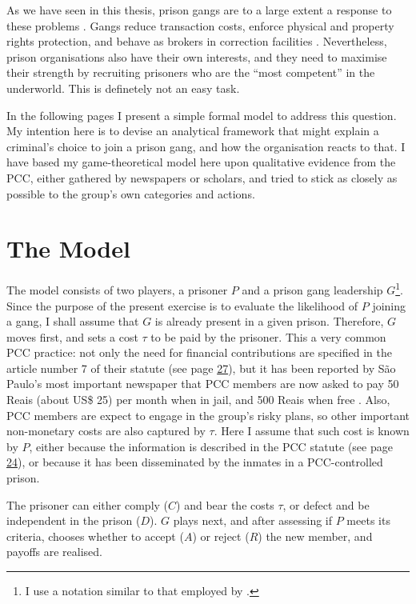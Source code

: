 As we have seen in this thesis, prison gangs are to a large extent a response to these problems \citep[]{camp1985prison, fleisher2001overview}. Gangs reduce transaction costs, enforce physical and property rights protection, and behave as brokers in correction facilities \citep{buentello1991prison, delisi2004gang, skarbek2011governance}. Nevertheless, prison organisations also have their own interests, and they need to maximise their strength by recruiting prisoners who are the ``most competent'' in the underworld. This is definetely not an easy task. 

In the following pages I present a simple formal model to address this question. My intention here is to devise an analytical framework that might explain a criminal's choice to join a prison gang, and how the organisation reacts to that. I have based my game-theoretical model here upon qualitative evidence from the PCC, either gathered by newspapers or scholars, and tried to stick as closely as possible to the group's own categories and actions.

\section{The Model}

The model consists of two players, a prisoner $P$ and a prison gang leadership $G$\footnote{I use a notation similar to that employed by \cite{lessing2014cddrl}.}. Since the purpose of the present exercise is to evaluate the likelihood of $P$ joining a gang, I shall assume that $G$ is already present in a given prison. Therefore, $G$ moves first, and sets a cost $\tau$ to be paid by the prisoner. This a very common PCC practice: not only the need for financial contributions are specified in the article number 7 of their statute (see page \hyperlink{page.27}{27}), but it has been reported by S\~{a}o Paulo's most important newspaper that PCC members are now asked to pay 50 Reais  (about US\$ 25) per month when in jail, and 500 Reais when free \citep[]{folha2006criada}. Also, PCC members are expect to engage in the group's risky plans, so other important non-monetary costs are also captured by $\tau$. Here I assume that such cost is known by $P$, either because the information is described in the PCC statute (see page \hyperlink{page.24}{24}), or because it has been disseminated by the inmates in a PCC-controlled prison.

The prisoner can either comply ($C$) and bear the costs $\tau$, or defect and be independent in the prison ($D$). $G$ plays next, and after assessing if $P$ meets its criteria, chooses whether to accept ($A$) or reject ($R$) the new member, and payoffs are realised.

